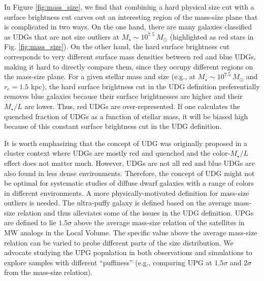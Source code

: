 \documentclass[twocolumn,astrosymb,twocolappendix]{aastex631}
\begin{document}
\begin{CJK*}{UTF8}{gbsn}
In Figure \ref{fig:mass_size}, we find that combining a hard physical size cut with a surface brightness cut carves out an interesting region of the mass-size plane that is complicated in two ways. On the one hand, there are many galaxies classified as UDGs that are not size outliers at $M_\star \sim 10^{7.5}\ M_\odot$ (highlighted as red stars in Fig. \ref{fig:mass_size}). On the other hand, the hard surface brightness cut corresponds to very different surface mass densities between red and blue UDGs, making it hard to directly compare them, since they occupy different regions on the mass-size plane. For a given stellar mass and size (e.g., at $M_\star \sim 10^{7.5}\ M_\odot$ and $r_e = 1.5$ kpc), the hard surface brightness cut in the UDG definition preferentially removes blue galaxies because their surface brightnesses are higher and their $M_\star/L$ are lower. Thus, red UDGs are over-represented. If one calculates the quenched fraction of UDGs as a function of stellar mass, it will be biased high because of this constant surface brightness cut in the UDG definition.

It is worth emphasizing that the concept of UDG was originally proposed in a cluster context where UDGs are mostly red and quenched \citep[e.g.,][]{vanDokkum2015} and the color-$M_\star/L$ effect does not matter much. However, UDGs are not all red and blue UDGs are also found in less dense environments. Therefore, the concept of UDG might not be optimal for systematic studies of diffuse dwarf galaxies with a range of colors in different environments. A more physically-motivated definition for mass-size outliers is needed. The ultra-puffy galaxy is defined based on the average mass-size relation and thus alleviates some of the issues in the UDG definition. UPGs are defined to lie $1.5\sigma$ above the average mass-size relation of the satellites in MW analogs in the Local Volume. The specific value above the average mass-size relation can be varied to probe different parts of the size distribution. We advocate studying the UPG population in both observations and simulations to explore samples with different ``puffiness'' (e.g., comparing UPG at $1.5\sigma$ and $2\sigma$ from the mass-size relation). 



\end{CJK*}
\end{document}
